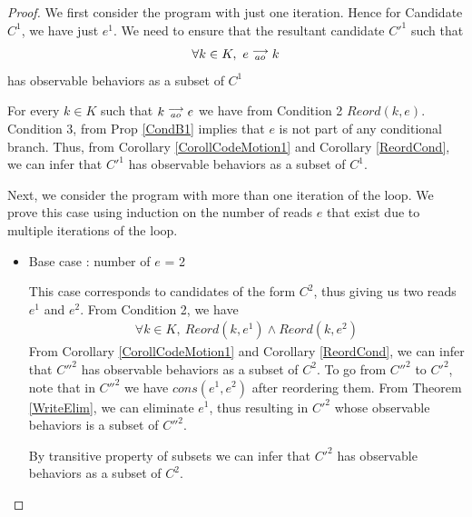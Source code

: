             \begin{proof}


                We first consider the program with just one iteration. Hence for Candidate $C^1$, we have just $e^1$. 
                We need to ensure that the resultant candidate $C'^1$ such that 
                \begin{align*}
                    \forall k \in K, \ e\stackrel{\longrightarrow}{_{ao}}k
                \end{align*}  
                has observable behaviors as a subset of $C^1$

                For every $k \in K$ such that $k\stackrel{\longrightarrow}{_{ao}}e$ we have from Condition 2 $Reord(k,e)$. 
                Condition 3, from Prop \ref{CondB1} implies that $e$ is not part of any conditional branch.
                Thus, from Corollary \ref{CorollCodeMotion1} and Corollary \ref{ReordCond}, we can infer that $C'^1$ has observable behaviors as a subset of $C^1$. 
                
                Next, we consider the program with more than one iteration of the loop. 
                We prove this case using induction on the number of reads $e$ that exist due to multiple iterations of the loop. 


                \begin{itemize}

                    \item Base case : number of $e$ = 2
                
                    This case corresponds to candidates of the form $C^2$, thus giving us two reads $e^1$ and $e^2$.
                    From Condition 2, we have
                    \begin{align*}
                        \forall k \in K, \ Reord(k,e^1) \wedge Reord(k, e^2)
                    \end{align*} 
                    From Corollary \ref{CorollCodeMotion1} and Corollary \ref{ReordCond}, we can infer that $C''^2$ has observable behaviors as a subset of $C^2$.
                    To go from $C''^2$ to $C'^2$, note that in $C''^2$ we have $cons(e^1, e^2)$ after reordering them. 
                    From Theorem \ref{WriteElim}, we can eliminate $e^1$, thus resulting in $C'^2$ whose observable behaviors is a subset of $C''^2$.
                    
                    By transitive property of subsets we can infer that $C'^2$ has observable behaviors as a subset of $C^2$.
                    

\end{itemize}
\end{proof}
